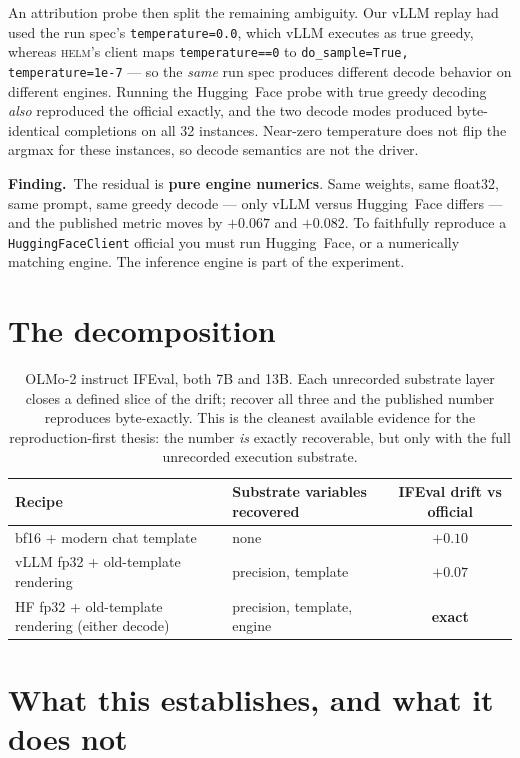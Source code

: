 \documentclass[11pt]{report}
\newcommand{\code}[1]{\texttt{#1}}
\newcommand{\finding}[1]{\par\noindent\textbf{Finding.}~#1\par}
\begin{document}
An attribution probe then split the remaining ambiguity. Our vLLM replay had used the
run spec's \code{temperature=0.0}, which vLLM executes as true greedy, whereas
\textsc{helm}'s client maps \code{temperature==0} to
\code{do\_sample=True, temperature=1e-7} --- so the \emph{same} run spec produces
different decode behavior on different engines. Running the Hugging~Face probe with
true greedy decoding \emph{also} reproduced the official exactly, and the two decode
modes produced byte-identical completions on all 32 instances. Near-zero temperature
does not flip the argmax for these instances, so decode semantics are not the driver.

\finding{The residual is \textbf{pure engine numerics}. Same weights, same float32,
same prompt, same greedy decode --- only vLLM versus Hugging~Face differs --- and the
published metric moves by $+0.067$ and $+0.082$. To faithfully reproduce a
\code{HuggingFaceClient} official you must run Hugging~Face, or a numerically
matching engine. The inference engine is part of the experiment.}

\section{The decomposition}

\begin{table}[H]
\centering
\small
\begin{tabular}{llc}
\toprule
\textbf{Recipe} & \textbf{Substrate variables recovered} &
\textbf{IFEval drift vs official} \\
\midrule
bf16 + modern chat template & none & $+0.10$ \\
vLLM fp32 + old-template rendering & precision, template & $+0.07$ \\
HF fp32 + old-template rendering (either decode) & precision, template, engine &
\textbf{exact} \\
\bottomrule
\end{tabular}
\caption{OLMo-2 instruct IFEval, both 7B and 13B. Each unrecorded substrate layer
closes a defined slice of the drift; recover all three and the published number
reproduces byte-exactly. This is the cleanest available evidence for the
reproduction-first thesis: the number \emph{is} exactly recoverable, but only with
the full unrecorded execution substrate.}
\label{tab:decomposition}
\end{table}

\section{What this establishes, and what it does not}
\end{document}
